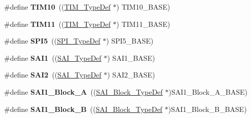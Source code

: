 \begin{DoxyCompactItemize}
\item 
\mbox{\label{group___peripheral__declaration_ga46b2ad3f5f506f0f8df0d2ec3e767267}} 
\#define {\bfseries T\+I\+M10}~((\mbox{\hyperlink{struct_t_i_m___type_def}{T\+I\+M\+\_\+\+Type\+Def}} $\ast$) T\+I\+M10\+\_\+\+B\+A\+SE)
\item 
\mbox{\label{group___peripheral__declaration_gacfd11ef966c7165f57e2cebe0abc71ad}} 
\#define {\bfseries T\+I\+M11}~((\mbox{\hyperlink{struct_t_i_m___type_def}{T\+I\+M\+\_\+\+Type\+Def}} $\ast$) T\+I\+M11\+\_\+\+B\+A\+SE)
\item 
\mbox{\label{group___peripheral__declaration_ga5e676c061e19ced149b7c6de6b8985e5}} 
\#define {\bfseries S\+P\+I5}~((\mbox{\hyperlink{struct_s_p_i___type_def}{S\+P\+I\+\_\+\+Type\+Def}} $\ast$) S\+P\+I5\+\_\+\+B\+A\+SE)
\item 
\mbox{\label{group___peripheral__declaration_gaa878b214698fcf74a3268d07562abbb2}} 
\#define {\bfseries S\+A\+I1}~((\mbox{\hyperlink{struct_s_a_i___type_def}{S\+A\+I\+\_\+\+Type\+Def}} $\ast$) S\+A\+I1\+\_\+\+B\+A\+SE)
\item 
\mbox{\label{group___peripheral__declaration_gac248a1f09e97346a66175a54ca7f9062}} 
\#define {\bfseries S\+A\+I2}~((\mbox{\hyperlink{struct_s_a_i___type_def}{S\+A\+I\+\_\+\+Type\+Def}} $\ast$) S\+A\+I2\+\_\+\+B\+A\+SE)
\item 
\mbox{\label{group___peripheral__declaration_gaa29e42155e075c03d156d759b4e69c5c}} 
\#define {\bfseries S\+A\+I1\+\_\+\+Block\+\_\+A}~((\mbox{\hyperlink{struct_s_a_i___block___type_def}{S\+A\+I\+\_\+\+Block\+\_\+\+Type\+Def}} $\ast$)S\+A\+I1\+\_\+\+Block\+\_\+\+A\+\_\+\+B\+A\+SE)
\item 
\mbox{\label{group___peripheral__declaration_gaaa4ab9bf6de588a9309acd4bf007c4e0}} 
\#define {\bfseries S\+A\+I1\+\_\+\+Block\+\_\+B}~((\mbox{\hyperlink{struct_s_a_i___block___type_def}{S\+A\+I\+\_\+\+Block\+\_\+\+Type\+Def}} $\ast$)S\+A\+I1\+\_\+\+Block\+\_\+\+B\+\_\+\+B\+A\+SE)
\item 
\mbox{\label{group___peripheral__declaration_gadeb449169ceaa1c73656a73be1798193}} 

\end{DoxyCompactItemize}
